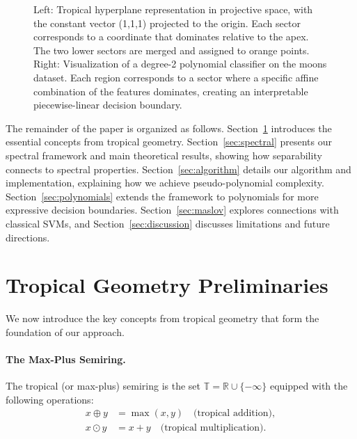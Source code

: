 \documentclass{article}
\newcommand{\R}{\mathbb{R}}
\newcommand{\trop}{\mathbb{T}}
\begin{document}
\begin{figure}[h]
    \centering
    \begin{subfigure}[b]{0.35\textwidth}
        \centering
        \resizebox{\textwidth}{!}{\clipbox{0.20\width{} 0.20\height{} 0.20\width{} 0.20\height{}}{}}
    \end{subfigure}
    \hfill
    \begin{subfigure}[b]{0.61\textwidth}
        \centering
        \resizebox{\textwidth}{!}{\clipbox{0.15\width{} 0.30\height{} 0.15\width{} 0.30\height{}}{}}
    \end{subfigure}
    \caption{Left: Tropical hyperplane representation in projective space, with the constant vector (1,1,1) projected to the origin. Each sector corresponds to a coordinate that dominates relative to the apex. The two lower sectors are merged and assigned to orange points. Right: Visualization of a degree-2 polynomial classifier on the moons dataset. Each region corresponds to a sector where a specific affine combination of the features dominates, creating an interpretable piecewise-linear decision boundary.}
    \label{fig:tropical_poly}
\end{figure}
The remainder of the paper is organized as follows. Section~\ref{sec:prelim} introduces the essential concepts from tropical geometry. Section~\ref{sec:spectral} presents our spectral framework and main theoretical results, showing how separability connects to spectral properties. Section~\ref{sec:algorithm} details our algorithm and implementation, explaining how we achieve pseudo-polynomial complexity. Section~\ref{sec:polynomials} extends the framework to polynomials for more expressive decision boundaries. Section~\ref{sec:maslov} explores connections with classical SVMs, and Section~\ref{sec:discussion} discusses limitations and future directions.

\section{Tropical Geometry Preliminaries}\label{sec:prelim}

We now introduce the key concepts from tropical geometry that form the foundation of our approach.

\paragraph{The Max-Plus Semiring.}
The tropical (or max-plus) semiring is the set $\trop = \R \cup \{-\infty\}$
equipped with the following operations:
\begin{align}
x \oplus y &= \max(x,y) \quad \text{(tropical addition)}, \\
x \odot y &= x + y \quad \text{(tropical multiplication)}.
\end{align}
\end{document}
